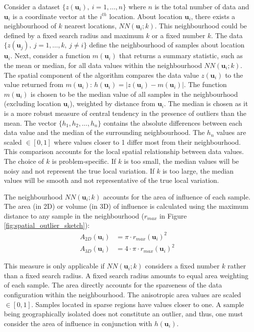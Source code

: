 Consider a dataset $\{z(\mathbf{u}_{i}), \ i = 1, \dots, n\}$ where $n$ is the total number of data and $\mathbf{u}_{i}$ is a coordinate vector at the $i^{th}$ location. About location $\mathbf{u}_{i}$, there exists a neighbourhood of $k$ nearest locations, $NN(\mathbf{u}_{i}; k)$. This neighbourhood could be defined by a fixed search radius and maximum $k$ or a fixed number $k$. The data $\{z(\mathbf{u}_{j}), \ j = 1, \dots, k, \ j \neq i \}$ define the neighbourhood of samples about location $\mathbf{u}_{i}$. Next, consider a function $m(\mathbf{u}_{i})$ that returns a summary statistic, such as the mean or median, for all data values within the neighbourhood $NN(\mathbf{u}_{i}; k)$. The spatial component of the algorithm compares the data value $z(\mathbf{u}_{i})$ to the value returned from $m(\mathbf{u}_{i})$: $h(\mathbf{u}_{i}) = |z(\mathbf{u}_{i}) - m(\mathbf{u}_{i})|$. The function $m(\mathbf{u}_{i})$ is chosen to be the median value of all samples in the neighbourhood (excluding location $\mathbf{u}_{i}$), weighted by distance from $\mathbf{u}_{i}$. The median is chosen as it is a more robust measure of central tendency in the presence of outliers than the mean. The vector $\{h_{1}, h_{2}, \dots, h_{n}\}$ contains the absolute differences between each data value and the median of the surrounding neighbourhood. The $h_{n}$ values are scaled $\in [0,1]$ where values closer to 1 differ most from their neighbourhood. This comparison accounts for the local spatial relationship between data values. The choice of $k$ is problem-specific. If $k$ is too small, the median values will be noisy and not represent the true local variation. If $k$ is too large, the median values will be smooth and not representative of the true local variation.

The neighbourhood $NN(\mathbf{u}_{i}; k)$ accounts for the area of influence of each sample. The area (in \acrshort{2D}) or volume (in \acrshort{3D}) of influence is calculated using the maximum distance to any sample in the neighbourhood ($r_{max}$ in Figure \ref{fig:spatial_outlier_sketch}):
\begin{align}
    A_{2D}(\mathbf{u}_{i}) & = \pi \cdot r_{max}(\mathbf{u}_{i})^{2}         \\
    A_{3D}(\mathbf{u}_{i}) & = 4 \cdot \pi \cdot r_{max}(\mathbf{u}_{i})^{2}
    \label{eq:aoi}
\end{align}

This measure is only applicable if $NN(\mathbf{u}_{i}; k)$ considers a fixed number $k$ rather than a fixed search radius. A fixed search radius amounts to equal area weighting of each sample. The area directly accounts for the sparseness of the data configuration within the neighbourhood. The anisotropic area values are scaled $\in [0,1]$. Samples located in sparse regions have values closer to one. A sample being geographically isolated does not constitute an outlier, and thus, one must consider the area of influence in conjunction with $h(\mathbf{u}_{i})$.

